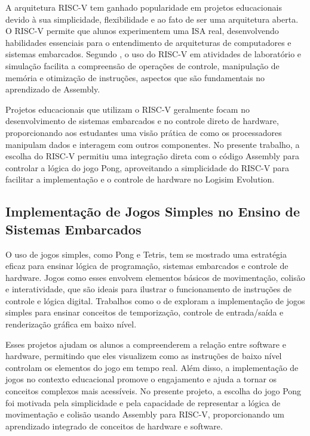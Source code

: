 \documentclass[english, spanish,brazilian]{RBIEarticle} %
\begin{document}
\begin{itemize}
A arquitetura RISC-V tem ganhado popularidade em projetos educacionais devido à sua simplicidade, flexibilidade e ao fato de ser uma arquitetura aberta. O RISC-V permite que alunos experimentem uma ISA real, desenvolvendo habilidades essenciais para o entendimento de arquiteturas de computadores e sistemas embarcados. Segundo \cite{outroAutorAno}, o uso do RISC-V em atividades de laboratório e simulação facilita a compreensão de operações de controle, manipulação de memória e otimização de instruções, aspectos que são fundamentais no aprendizado de Assembly.

Projetos educacionais que utilizam o RISC-V geralmente focam no desenvolvimento de sistemas embarcados e no controle direto de hardware, proporcionando aos estudantes uma visão prática de como os processadores manipulam dados e interagem com outros componentes. No presente trabalho, a escolha do RISC-V permitiu uma integração direta com o código Assembly para controlar a lógica do jogo Pong, aproveitando a simplicidade do RISC-V para facilitar a implementação e o controle de hardware no Logisim Evolution.

\subsection{Implementação de Jogos Simples no Ensino de Sistemas Embarcados}

O uso de jogos simples, como Pong e Tetris, tem se mostrado uma estratégia eficaz para ensinar lógica de programação, sistemas embarcados e controle de hardware. Jogos como esses envolvem elementos básicos de movimentação, colisão e interatividade, que são ideais para ilustrar o funcionamento de instruções de controle e lógica digital. Trabalhos como o de \cite{autorJogoSimples} exploram a implementação de jogos simples para ensinar conceitos de temporização, controle de entrada/saída e renderização gráfica em baixo nível.

Esses projetos ajudam os alunos a compreenderem a relação entre software e hardware, permitindo que eles visualizem como as instruções de baixo nível controlam os elementos do jogo em tempo real. Além disso, a implementação de jogos no contexto educacional promove o engajamento e ajuda a tornar os conceitos complexos mais acessíveis. No presente projeto, a escolha do jogo Pong foi motivada pela simplicidade e pela capacidade de representar a lógica de movimentação e colisão usando Assembly para RISC-V, proporcionando um aprendizado integrado de conceitos de hardware e software.


\end{itemize}
\end{document}
